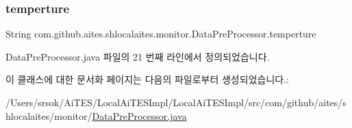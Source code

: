 \subsubsection{\texorpdfstring{temperture}{temperture}}
{\footnotesize\ttfamily String com.\+github.\+aites.\+shlocalaites.\+monitor.\+Data\+Pre\+Processor.\+temperture\hspace{0.3cm}{\ttfamily [private]}}



Data\+Pre\+Processor.\+java 파일의 21 번째 라인에서 정의되었습니다.



이 클래스에 대한 문서화 페이지는 다음의 파일로부터 생성되었습니다.\+:\begin{DoxyCompactItemize}
\item 
/\+Users/srsok/\+Ai\+T\+E\+S/\+Local\+Ai\+T\+E\+S\+Impl/\+Local\+Ai\+T\+E\+S\+Impl/src/com/github/aites/shlocalaites/monitor/\mbox{\hyperlink{_data_pre_processor_8java}{Data\+Pre\+Processor.\+java}}\end{DoxyCompactItemize}
